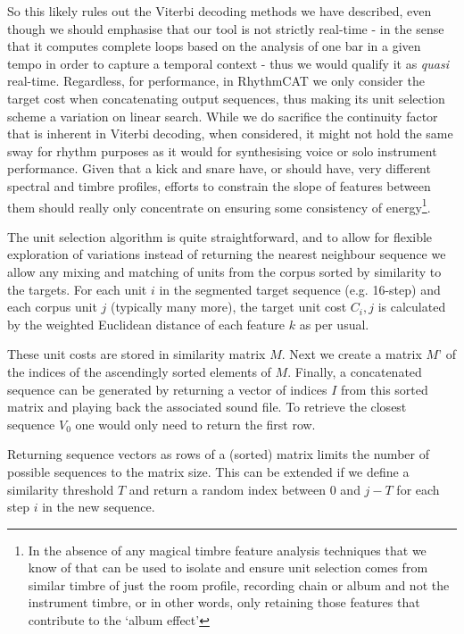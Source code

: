 So this likely rules out the Viterbi decoding methods we have described, even though we should emphasise that our tool is not strictly real-time - in the sense that it computes complete loops based on the analysis of one bar in a given tempo in order to capture a temporal context - thus we would qualify it as \textit{quasi} real-time. Regardless, for performance, in RhythmCAT we only consider the target cost when concatenating output sequences, thus making its unit selection scheme a variation on linear search. While we do sacrifice the continuity factor that is inherent in Viterbi decoding, when considered, it might not hold the same sway for rhythm purposes as it would for synthesising voice or solo instrument performance. Given that a kick and snare have, or should have, very different spectral and timbre profiles, efforts to constrain the slope of features between them should really only concentrate on ensuring some consistency of energy\footnote{In the absence of any magical timbre feature analysis techniques that we know of that can be used to isolate and ensure unit selection comes from similar timbre of just the room profile, recording chain or album and not the instrument timbre, or in other words, only retaining those features that contribute to the `album effect'\citep{mandel2005song, kim2006towards}}.

The unit selection algorithm is quite straightforward, and to allow for flexible exploration of variations instead of returning the nearest neighbour sequence we allow any mixing and matching of units from the corpus sorted by similarity to the targets. For each unit $i$ in the segmented target sequence (e.g. 16-step) and each corpus unit $j$ (typically many more), the target unit cost $C_i,j$ is calculated by the weighted Euclidean distance of each feature $k$ as per usual.

These unit costs are stored in similarity matrix $M$. Next we create a matrix $M’$ of the indices of the ascendingly sorted elements of $M$. Finally, a concatenated sequence can be generated by returning a vector of indices $I$ from this sorted matrix and playing back the associated sound file. To retrieve the closest sequence $V_0$ one would only need to return the first row.

Returning sequence vectors as rows of a (sorted) matrix limits the number of possible sequences to the matrix size. This can be extended if we define a similarity threshold $T$ and return a random index between $0$ and $j − T$ for each step $i$ in the new sequence.

